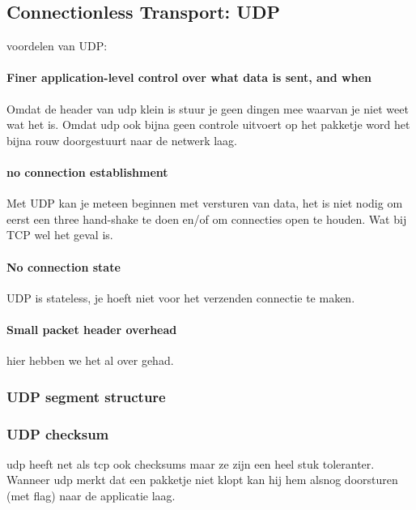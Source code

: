 \subsection{Connectionless Transport: UDP}
voordelen van UDP:
\paragraph{Finer application-level control over what data is sent, and when} Omdat de header van udp klein is stuur je geen dingen mee waarvan je niet weet wat het is. Omdat udp ook bijna geen controle uitvoert op het pakketje word het bijna rouw doorgestuurt naar de netwerk laag.
\paragraph{no connection establishment} Met UDP kan je meteen beginnen met versturen van data, het is niet nodig om eerst een three hand-shake te doen en/of om connecties open te houden. Wat bij TCP wel het geval is.
\paragraph{No connection state} UDP is stateless, je hoeft niet voor het verzenden connectie te maken.
\paragraph{Small packet header overhead} hier hebben we het al over gehad.
\subsubsection{UDP segment structure}
\subsubsection{UDP checksum}
udp heeft net als tcp ook checksums maar ze zijn een heel stuk toleranter. Wanneer udp merkt dat een pakketje niet klopt kan hij hem alsnog doorsturen (met flag) naar de applicatie laag.
